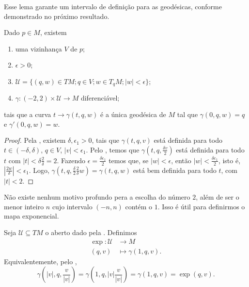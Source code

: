 Esse lema garante um intervalo de definição para as geodésicas, conforme demonstrado no próximo resultado.
\begin{proposition}
    \label{prop:geodesicas-tempo-2}
    Dado $p \in M$, existem
    \begin{enumerate}[label=(\roman*)]
        \item uma vizinhança $V$ de $p$;
        \item $\epsilon>0$;
        \item $\mathcal{U}=\{ (q,w)\in TM;q\in V; w \in T_{q}M; |w|<\epsilon \}$;
        \item $\gamma:(-2,2)\times \mathcal{U}\to M$ diferenciável;
    \end{enumerate}
    tais que a curva $t\to \gamma(t,q,w)$ é  a única geodésica de $M$ tal que $\gamma(0,q,w)=q$ e $\gamma'(0,q,w)=w$.
    \begin{proof}

        Pela , existem $\delta,\epsilon_{1}>0$, tais que $\gamma(t,q,v)$ está definida para todo $t \in (-\delta,\delta)$, $q \in V$, $|v|<\epsilon_{1}$. Pelo , temos que $\gamma\left( t,q,\frac{\delta v}{2} \right)$ está definida para todo $t$ com $|t|<\delta\frac{2}{\delta}=2$.
        Fazendo $\epsilon=\frac{\delta\epsilon_{1}}{2}$ temos que, se $|w|<\epsilon$, então $|w|<\frac{\delta e_{1}}{2}$, isto é, $|\frac{2w}{\delta}|<\epsilon_{1}$. Logo, $\gamma\left( t,q,\frac{\delta}{2}\frac{2}{\delta}w \right)=\gamma(t,q,w)$ está bem definida para todo $t$, com $|t|<2$.
    \end{proof}
\end{proposition}
Não existe nenhum motivo profundo pera a escolha do número $2$, além de ser o menor inteiro $n$ cujo intervalo $(-n,n)$ contém o $1$. Isso é útil para definirmos o mapa exponencial.
\begin{definition}
    \label{def:aplicacao-exponencial}
    Seja $\mathcal{U}\subseteq TM$ o aberto dado pela .
    Definimos
    \begin{align*}
        \exp\colon \mathcal{U} & \longrightarrow M           \\
        (q,v)                  & \longmapsto  \gamma(1,q,v).
    \end{align*}
    Equivalentemente, pelo ,
    \begin{equation*}
        \gamma\left( |v|,q,\frac{v}{|v|} \right)=\gamma\left( 1,q,|v|\frac{v}{|v|} \right)=\gamma(1,q,v)=\exp(q,v).
    \end{equation*}
\end{definition}
